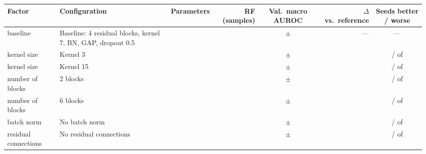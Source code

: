 \begin{tabular}{llrrcrc}
\toprule
Factor & Configuration & Parameters & RF (samples) & Val.\ macro AUROC & $\Delta$ vs.\ reference & Seeds better / worse \\
\midrule
baseline & Baseline: 4 residual blocks, kernel 7, BN, GAP, dropout 0.5 & \cnnParamsBase{} & \cnnRfSamplesBase{} & \cnnValAurocMeanBase{} $\pm$ \cnnValAurocSdBase{} & --- & --- \\
\addlinespace
kernel size & Kernel 3 & \cnnParamsKernelThree{} & \cnnRfSamplesKernelThree{} & \cnnValAurocMeanKernelThree{} $\pm$ \cnnValAurocSdKernelThree{} & \cnnDiffMeanKernelThree{} & \cnnNSeedsBetterKernelThree{} / \cnnNSeedsWorseKernelThree{} of \cnnNSeedsComparedKernelThree{} \\
kernel size & Kernel 15 & \cnnParamsKernelOneFive{} & \cnnRfSamplesKernelOneFive{} & \cnnValAurocMeanKernelOneFive{} $\pm$ \cnnValAurocSdKernelOneFive{} & \cnnDiffMeanKernelOneFive{} & \cnnNSeedsBetterKernelOneFive{} / \cnnNSeedsWorseKernelOneFive{} of \cnnNSeedsComparedKernelOneFive{} \\
\addlinespace
number of blocks & 2 blocks & \cnnParamsDepthTwo{} & \cnnRfSamplesDepthTwo{} & \cnnValAurocMeanDepthTwo{} $\pm$ \cnnValAurocSdDepthTwo{} & \cnnDiffMeanDepthTwo{} & \cnnNSeedsBetterDepthTwo{} / \cnnNSeedsWorseDepthTwo{} of \cnnNSeedsComparedDepthTwo{} \\
number of blocks & 6 blocks & \cnnParamsDepthSix{} & \cnnRfSamplesDepthSix{} & \cnnValAurocMeanDepthSix{} $\pm$ \cnnValAurocSdDepthSix{} & \cnnDiffMeanDepthSix{} & \cnnNSeedsBetterDepthSix{} / \cnnNSeedsWorseDepthSix{} of \cnnNSeedsComparedDepthSix{} \\
\addlinespace
batch norm & No batch norm & \cnnParamsNoBn{} & \cnnRfSamplesNoBn{} & \cnnValAurocMeanNoBn{} $\pm$ \cnnValAurocSdNoBn{} & \cnnDiffMeanNoBn{} & \cnnNSeedsBetterNoBn{} / \cnnNSeedsWorseNoBn{} of \cnnNSeedsComparedNoBn{} \\
\addlinespace
residual connections & No residual connections & \cnnParamsNoResidual{} & \cnnRfSamplesNoResidual{} & \cnnValAurocMeanNoResidual{} $\pm$ \cnnValAurocSdNoResidual{} & \cnnDiffMeanNoResidual{} & \cnnNSeedsBetterNoResidual{} / \cnnNSeedsWorseNoResidual{} of \cnnNSeedsComparedNoResidual{} \\

\end{tabular}
